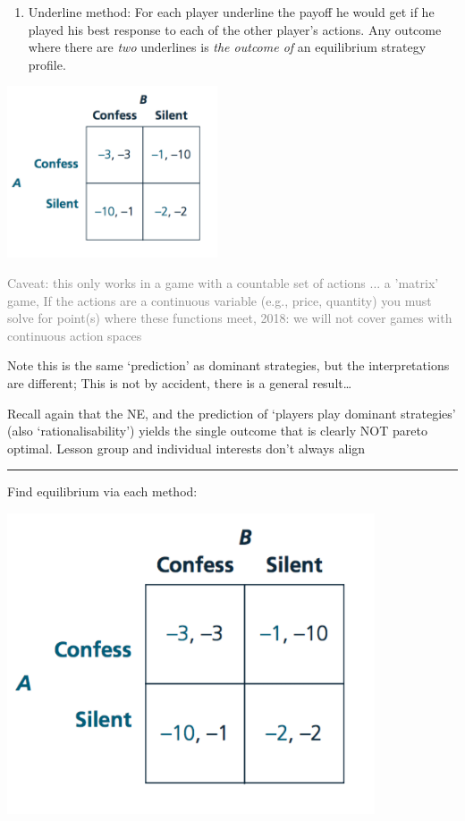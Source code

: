 \documentclass[]{article}
\providecommand{\tightlist}{%
  \setlength{\itemsep}{0pt}\setlength{\parskip}{0pt}}
\begin{document}
\bigskip

\begin{enumerate}
\def\labelenumi{\arabic{enumi}.}
\setcounter{enumi}{1}
\tightlist
\item
  Underline method: For each player underline the payoff he would get if
  he played his best response to each of the other player's actions. Any
  outcome where there are \emph{two} underlines is \emph{the outcome of}
  an equilibrium strategy profile.
\end{enumerate}

\includegraphics[height=2in]{picsfigs/pd_normal.png}

\textcolor{gray}{Caveat: this only works in a game with a countable set of actions ... a 'matrix' game,
If the actions are a continuous variable (e.g., price, quantity) you must solve for point(s) where these functions meet,
2018: we will not cover games with continuous action spaces}

Note this is the same `prediction' as dominant strategies, but the
interpretations are different; This is not by accident, there is a
general result\ldots{}

Recall again that the NE, and the prediction of `players play dominant
strategies' (also `rationalisability') yields the single outcome that is
clearly NOT pareto optimal. Lesson group and individual interests don't
always align

\begin{center}\rule{0.5\linewidth}{\linethickness}\end{center}

Find equilibrium via each method:

\includegraphics[height=3.5in]{picsfigs/pd_normal.png}
\end{document}
